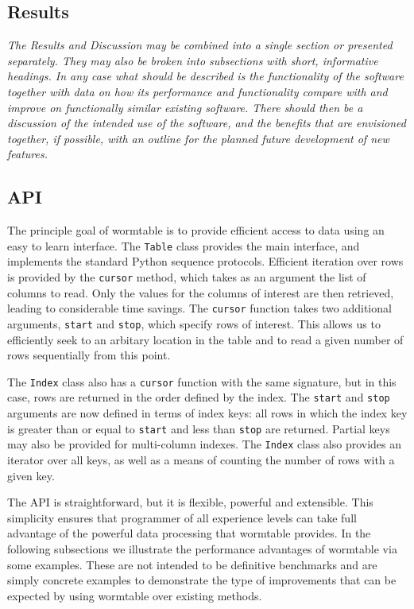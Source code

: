 \documentclass[10pt]{bmc_article}
\newenvironment{bmcformat}{\begin{raggedright}\baselineskip20pt\sloppy\setboolean{publ}{false}}{\end{raggedright}\baselineskip20pt\sloppy}
\begin{document}
\begin{bmcformat}
\section*{Results}

\emph{The Results and Discussion may be combined into a single section or
presented separately. They may also be broken into subsections with
short, informative headings. In any case what should be described is the
functionality of the software together with data on how its performance
and functionality compare with and improve on functionally similar
existing software. There should then be a discussion of the intended
use of the software, and the benefits that are envisioned together,
if possible, with an outline for the planned future development of
new features.}

\subsection*{API}
The principle goal of wormtable is to provide efficient access to data 
using an easy to learn interface. 
The \texttt{Table} class provides the main interface,
and implements the standard Python sequence protocols. Efficient 
iteration over rows is provided by the \texttt{cursor} method, 
which takes as an argument the list of columns to read.
Only the values for the columns 
of interest are then retrieved, leading to considerable
time savings. The \texttt{cursor} function takes two additional 
arguments, \texttt{start} and \texttt{stop}, which specify 
rows of interest. This allows us to efficiently seek to an 
arbitary location in the table and to read a given number 
of rows sequentially from this point.

The \texttt{Index} class also has a \texttt{cursor} function
with the same signature, but in this case, rows 
are returned in the order defined by the index. The  
\texttt{start} and \texttt{stop} arguments are now defined 
in terms of index keys: all rows in which the index key
is greater than or equal to \texttt{start} and less 
than \texttt{stop} are returned. Partial keys may also be 
provided for multi-column indexes. The \texttt{Index} 
class also provides an iterator over all keys, as well 
as a means of counting the number of rows with a given 
key.

The API is straightforward, but it is flexible, powerful and 
extensible. This simplicity ensures that 
programmer of all experience levels  
can take full advantage of the powerful data 
processing that wormtable provides. In the following subsections 
we illustrate the performance advantages of wormtable via some 
examples. These are not intended to be definitive benchmarks
and are simply concrete examples to demonstrate the type of improvements 
that can be expected by using wormtable over existing methods.


\end{bmcformat}
\end{document}

